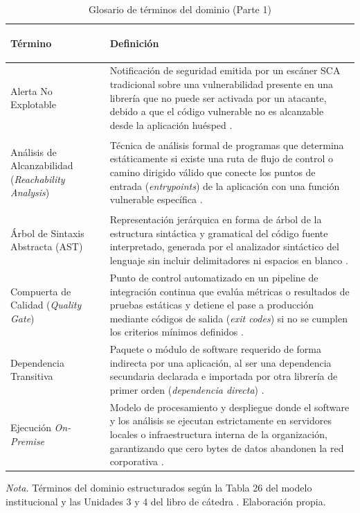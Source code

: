 \documentclass[12pt,a4paper]{article}
\begin{document}
\begin{table}[H]
\centering
\caption{Glosario de términos del dominio (Parte 1)}
\label{tab:glosario_terminos_u3_u4}
\small
{}
\begin{tabularx}{\textwidth}{>{\bfseries\raggedright\arraybackslash}p{4.4cm} X}
\toprule
\textbf{Término} & \textbf{Definición} \\
\midrule
Alerta No Explotable & 
Notificación de seguridad emitida por un escáner SCA tradicional sobre una vulnerabilidad presente en una librería que no puede ser activada por un atacante, debido a que el código vulnerable no es alcanzable desde la aplicación huésped \parencite{pashchenko2022vuln4real}. \\
\addlinespace
Análisis de Alcanzabilidad (\textit{Reachability Analysis}) & 
Técnica de análisis formal de programas que determina estáticamente si existe una ruta de flujo de control o camino dirigido válido que conecte los puntos de entrada (\textit{entrypoints}) de la aplicación con una función vulnerable específica \parencite{dann2021identifying, ponta2020detection}. \\
\addlinespace
Árbol de Sintaxis Abstracta (AST) & 
Representación jerárquica en forma de árbol de la estructura sintáctica y gramatical del código fuente interpretado, generada por el analizador sintáctico del lenguaje sin incluir delimitadores ni espacios en blanco \parencite{salis2021pycg}. \\
\addlinespace
Compuerta de Calidad (\textit{Quality Gate}) & 
Punto de control automatizado en un pipeline de integración continua que evalúa métricas o resultados de pruebas estáticas y detiene el pase a producción mediante códigos de salida (\textit{exit codes}) si no se cumplen los criterios mínimos definidos \parencite{humble2010continuous}. \\
\addlinespace
Dependencia Transitiva & 
Paquete o módulo de software requerido de forma indirecta por una aplicación, al ser una dependencia secundaria declarada e importada por otra librería de primer orden (\textit{dependencia directa}) \parencite{decan2019empirical, alfadel2023empirical}. \\
\addlinespace
Ejecución \textit{On-Premise} & 
Modelo de procesamiento y despliegue donde el software y los análisis se ejecutan estrictamente en servidores locales o infraestructura interna de la organización, garantizando que cero bytes de datos abandonen la red corporativa \parencite{ladisa2023sok, gutierrez2024auditoria}. \\
\bottomrule
\end{tabularx}
\vspace{2pt}
\begin{flushleft}
\scriptsize \textit{Nota.} Términos del dominio estructurados según la Tabla 26 del modelo institucional y las Unidades 3 y 4 del libro de cátedra \parencite{torres2026proyecto}. Elaboración propia.
\end{flushleft}
\end{table}
\end{document}
